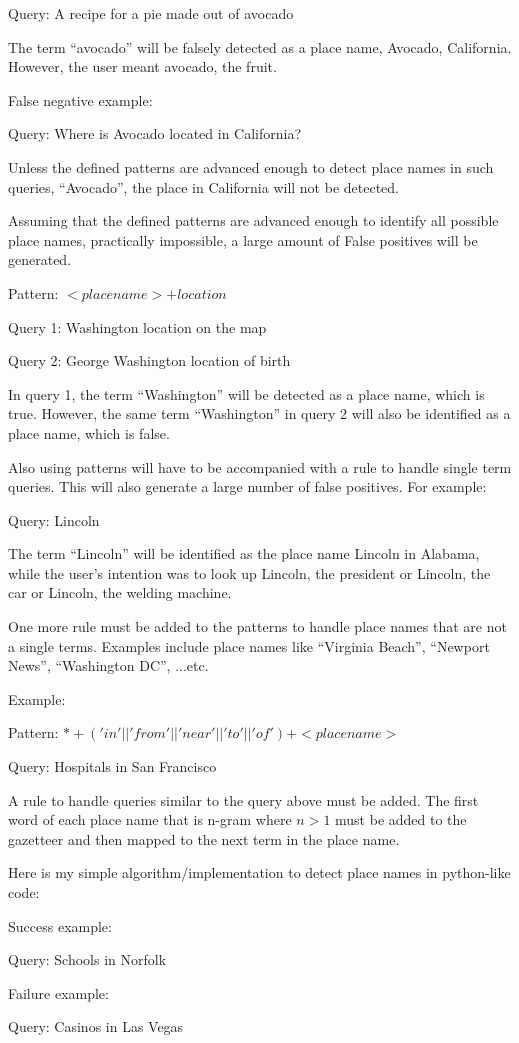 Query: A recipe for a pie made out of avocado

The term ``avocado'' will be falsely detected as a place name, Avocado, California. However, the user meant avocado, the fruit.

False negative example:

Query: Where is Avocado located in California?

Unless the defined patterns are advanced enough to detect place names in such queries, ``Avocado'', the place in California will not be detected.

Assuming that the defined patterns are advanced enough to identify all possible place names, practically impossible, a large amount of False positives will be generated.

Pattern: $<place name> + location$

Query 1: Washington location on the map

Query 2: George Washington location of birth

In query 1, the term ``Washington'' will be detected as a place name, which is true. However, the same term ``Washington'' in query 2 will also be identified as a place name, which is false.

Also using patterns will have to be accompanied with a rule to handle single term queries. This will also generate a large number of false positives. For example:

Query: Lincoln

The term ``Lincoln'' will be identified as the place name Lincoln in Alabama, while the user's intention was to look up Lincoln, the president or Lincoln, the car or Lincoln, the welding machine.

One more rule must be added to the patterns to handle place names that are not a single terms. Examples include place names like ``Virginia Beach'', ``Newport News'', ``Washington DC'', ...etc.

Example:

Pattern: $* + ('in' || 'from' || 'near' || 'to' || 'of' ) + <place name>$

Query: Hospitals in San Francisco

A rule to handle queries similar to the query above must be added. The first word of each place name that is n-gram where $n > 1$ must be added to the gazetteer and then mapped to the next term in the place name.

Here is my simple algorithm/implementation to detect place names in python-like code:


Success example:

Query: Schools in Norfolk

Failure example:

Query: Casinos in Las Vegas